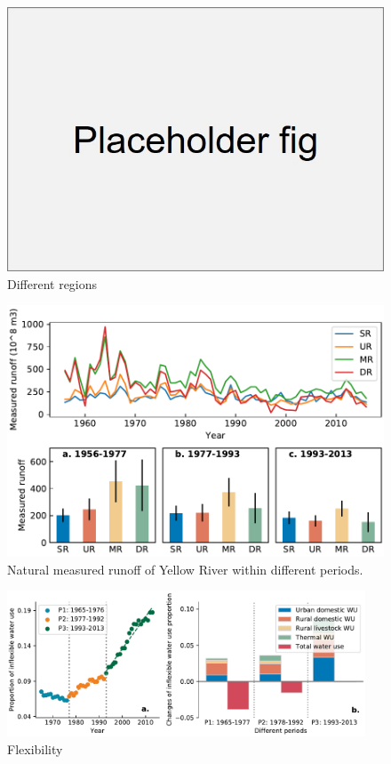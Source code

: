 \documentclass[9pt,twoside,lineno]{pnas-new}
\begin{document}
\begin{figure}
    \centering
    \includegraphics[width=\textwidth]{../../figures/placeholder_s}
    \caption{Different regions}
\end{figure}


\begin{figure}
    \centering
    \includegraphics[width=\textwidth]{../../figures/supplementary_information/sf_measured_runoff.pdf}
    \caption{Natural measured runoff of Yellow River within different periods.}
\end{figure}


\begin{figure}
    \centering
    \includegraphics[width=0.95\textwidth]{../../figures/supplementary_information/inflexible_wu.pdf}
    \caption{Flexibility}
\end{figure}
    
\end{document}
